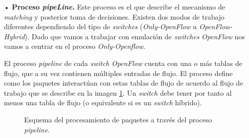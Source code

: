 \documentclass[a4paper,11pt]{book}
\begin{document}
\begin{itemize}

\item[•] \textbf{Proceso \textit{pipeLine}.} Este proceso es el que describe el mecanismo de \textit{matching} y posterior toma de decisiones. Existen dos modos de trabajo diferentes dependiendo del tipo de \textit{switches} (\textit{Only-OpenFlow} u \textit{OpenFlow-Hybrid}). Dado que vamos a trabajar con emulación de \textit{switches} \emph{OpenFlow} nos vamos a centrar en el proceso \textit{Only-Openflow}.

El proceso \textit{pipeline} de cada \textit{switch} \emph{OpenFlow} cuenta con una o más tablas de flujo, que a su vez contienen múltiples entradas de flujo. El proceso define como los paquetes interactúan con estas tablas de flujo de acuerdo al flujo de trabajo que se describe en la imagen \ref{pipeline}. Un \textit{switch} debe tener por tanto al menos una tabla de flujo (o equivalente si es un \textit{switch} híbrido).


\begin{figure}[tb]
\centering
\hspace*{-1.5cm}
\centering
\hspace*{-1.5cm}
\caption[Proceso \textit{pipeline}.]{Esquema del procesamiento de paquetes a través del proceso \textit{pipeline}.}\label{pipeline}
\end{figure}


\end{itemize}
\end{document}

